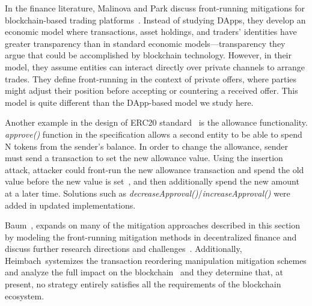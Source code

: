 In the finance literature, Malinova and Park discuss front-running mitigations for blockchain-based trading platforms~\cite{malinova2017market}. Instead of studying DApps, they develop an economic model where transactions, asset holdings, and traders' identities have greater transparency than in standard economic models---transparency they argue that could be accomplished by blockchain technology. However, in their model, they assume entities can interact directly over private channels to arrange trades. They define front-running in the context of private offers, where parties might adjust their position before accepting or countering a received offer. This model is quite different than the DApp-based model we study here. 

Another example in the design of ERC20 standard~\cite{erc20} is the allowance functionality. \textit{approve()} function in the specification allows a second entity to be able to spend N tokens from the sender's balance. In order to change the allowance, sender must send a transaction to set the new allowance value. Using the insertion attack, attacker could front-run the new allowance transaction and spend the old value before the new value is set~\cite{blockchainProjectAllowanceAttack,erc20GithubIssue}, and then additionally spend the new amount at a later time. Solutions such as \textit{decreaseApproval()}/\textit{increaseApproval()} were added in updated implementations.

Baum~\etal, expands on many of the mitigation approaches described in this section by modeling the front-running mitigation methods in decentralized finance and discuss further research directions and challenges~\cite{baum2022sok}. Additionally, Heimbach~\etal systemizes the transaction reordering manipulation mitigation schemes and analyze the full impact on the blockchain~\cite{heimbach2022sok} and they determine that, at present, no strategy entirely satisfies all the requirements of the blockchain ecosystem.


